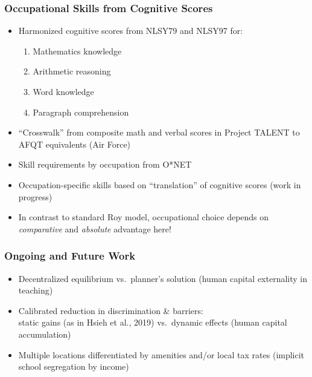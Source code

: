 \documentclass[11pt]{beamer}
\begin{document}
\begin{frame}
\frametitle{Occupational Skills from Cognitive Scores}
\begin{itemize}
  \item Harmonized cognitive scores from NLSY79 and NLSY97 for:
  \begin{enumerate}
  \item Mathematics knowledge
  \item Arithmetic reasoning
  \item Word knowledge
  \item Paragraph comprehension
\end{enumerate}
  \item ``Crosswalk'' from composite math and verbal scores in Project TALENT to AFQT equivalents (Air Force)
  \item Skill requirements by occupation from O*NET
  \item Occupation-specific skills based on ``translation'' of cognitive scores \alert{(work in progress)}
  \item In contrast to standard Roy model, occupational choice depends on {\it comparative} \alert{and} {\it absolute} advantage here!
\end{itemize}
\end{frame}

\begin{frame}
\frametitle{Ongoing and Future Work}
\begin{itemize}
  \item Decentralized equilibrium vs.~planner's solution (human capital externality in teaching)
  \item Calibrated reduction in discrimination \& barriers: \\ static gains (as in Hsieh et al., 2019) vs.~dynamic effects (human capital accumulation)
  \item Multiple locations differentiated by amenities and/or local tax rates (implicit school segregation by income)
\end{itemize}
\end{frame}
\end{document}
